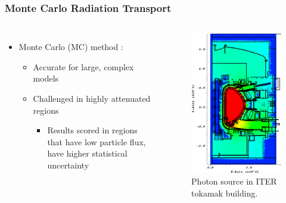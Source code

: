 \documentclass{beamer}
\begin{document}
\begin{frame}
\frametitle{Monte Carlo Radiation Transport}
\begin{columns}
\begin{itemize}
	\item{Monte Carlo (MC) method \cite{mcnp_manual}:}%
	\begin{itemize}
		\item{Accurate for large, complex models}
		\item{Challenged in highly attenuated regions}
                  \begin{itemize}
                  \item{Results scored in regions that have low particle flux, have higher statistical uncertainty}
                  \end{itemize}
	\end{itemize}
\end{itemize}

\begin{figure}
	\centering
	\includegraphics[scale=0.4]{iter_nflux_2.png}
	\caption{Photon source in ITER tokamak building.}
\end{figure}


\end{columns}
\end{frame}
\end{document}
